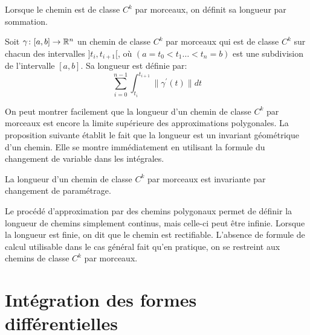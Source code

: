 Lorsque le chemin est de classe $C^k$ par morceaux, on définit sa longueur par sommation. 
\begin{fdefn}
Soit $\gamma \colon [a,b] \to \mathbb{R}^n$ un chemin de classe $C^k$ par morceaux qui est de classe $C^k$ sur chacun des intervalles $]t_i,t_{i+1}[$, où $(a=t_0 < t_1 \dots < t_n = b)$ est une subdivision de l'intervalle $[a,b]$. Sa longueur est définie par:
\[
\sum_{i=0}^{n-1} \int_{t_i}^{t_{i+1}} \| \gamma^\prime(t) \| dt
\]
\end{fdefn}
On peut montrer facilement que la longueur d'un chemin de classe $C^k$ par morceaux est encore la limite supérieure des approximations polygonales. La proposition suivante établit le fait que la longueur est un invariant géométrique d'un chemin. Elle se montre immédiatement en utilisant la formule du changement de variable dans les intégrales. 
\begin{fprop}
La longueur d'un chemin de classe $C^k$ par morceaux est invariante par changement de paramétrage.
\end{fprop}
\begin{rem}
Le procédé d'approximation par des chemins polygonaux permet de définir la longueur de chemins simplement continus, mais celle-ci peut être infinie. Lorsque la longueur est finie, on dit que le chemin est rectifiable. L'absence de formule de calcul utilisable dans le cas général fait qu'en pratique, on se restreint aux chemins de classe $C^k$ par morceaux. 
\end{rem}
\section{Intégration des formes différentielles}
